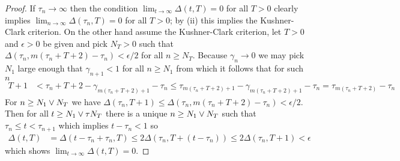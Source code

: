 \begin{proof}
If $\tau_n \to \infty$ then the condition $\lim_{t \to \infty} \Delta(t,T) = 0$ for all $T > 0$ clearly implies $\lim_{n \to \infty} \Delta(\tau_n,T) = 0$ for all $T > 0$; by (ii) this implies the Kushner-Clark 
criterion.  On the other hand assume the Kushner-Clark criterion, let  $T>0$ and $\epsilon>0$ be given and pick $N_T>0$ such that  $\Delta(\tau_n, m(\tau_n+T+2) - \tau_n) < \epsilon/2$ for all $n \geq N_T$.  Because $\gamma_n \to 0$ we may pick $N_1$ large enough that $\gamma_{n+1} < 1$ for all $n \geq N_1$ from which it follows that for such $n$
\begin{align*}
T + 1 &< \tau_n + T + 2 - \gamma_{m(\tau_n+T+2)+1} - \tau_n \leq \tau_{m(\tau_n + T + 2)+1} - \gamma_{m(\tau_n+T+2)+1} - \tau_n = \tau_{m(\tau_n + T + 2)} - \tau_n
\end{align*}
For $n \geq N_1 \vee N_T$ we have $\Delta(\tau_n, T+1) \leq \Delta(\tau_n, m(\tau_n+T+2) - \tau_n) < \epsilon/2$.  
Then for all $t \geq N_1 \vee \tau{N_T}$ there is a unique $n \geq N_1 \vee N_T$ such that $\tau_n \leq t < \tau_{n+1}$ which implies $t - \tau_{n} < 1$ so
\begin{align*}
\Delta(t,T) &= \Delta(t - \tau_n + \tau_n, T) \leq 2\Delta(\tau_n, T+ (t-\tau_n)) \leq 2 \Delta(\tau_n, T+1) < \epsilon
\end{align*}
which shows $\lim_{t \to \infty} \Delta(t,T) = 0$.
\end{proof}

